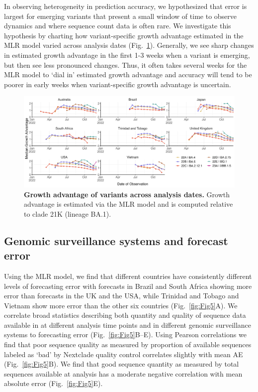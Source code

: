 In observing heterogeneity in prediction accuracy, we hypothesized that error is largest for emerging variants that present a small window of time to observe dynamics and where sequence count data is often rare.
We investigate this hypothesis by charting how variant-specific growth advantage estimated in the MLR model varied across analysis dates (Fig.~\ref{fig:Fig4}).
Generally, we see sharp changes in estimated growth advantage in the first 1-3 weeks when a variant is emerging, but then see less pronounced changes.
Thus, it often takes several weeks for the MLR model to `dial in' estimated growth advantage and accuracy will tend to be poorer in early weeks when variant-specific growth advantage is uncertain.



\begin{figure}[tb!]
	\centering
    \includegraphics[width=1.0\textwidth]{figures/ga_estimates.png}
	\caption{
		\textbf{Growth advantage of variants across analysis dates.}
		Growth advantage is estimated via the MLR model and is computed relative to clade 21K (lineage BA.1).
	}
	\label{fig:Fig4}
\end{figure}





\subsection*{Genomic surveillance systems and forecast error}

Using the MLR model, we find that different countries have consistently different levels of forecasting error with forecasts in Brazil and South Africa showing more error than forecasts in the UK and the USA, while Trinidad and Tobago and Vietnam show more error than the other six countries (Fig.~\ref{fig:Fig5}A).
We correlate broad statistics describing both quantity and quality of sequence data available in at different analysis time points and in different genomic surveillance systems to forecasting error (Fig.~\ref{fig:Fig5}B--E).
Using Pearson correlations we find that poor sequence quality as measured by proportion of available sequences labeled as `bad' by Nextclade quality control \cite{aksamentov2021nextclade} correlates slightly with mean AE (Fig.~\ref{fig:Fig5}B).
We find that good sequence quantity as measured by total sequences available at analysis has a moderate negative correlation with mean absolute error (Fig.~\ref{fig:Fig5}E).

